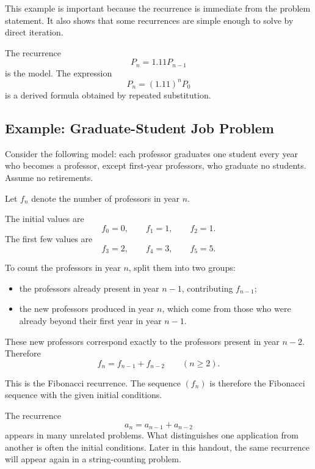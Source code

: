 This example is important because the recurrence is immediate from the problem statement. It also shows that some recurrences are simple enough to solve by direct iteration.

\begin{commonmistake}[title={Confusing the recurrence with the final closed form}]
The recurrence
\[
P_n=1.11P_{n-1}
\]
is the model. The expression
\[
P_n=(1.11)^nP_0
\]
is a derived formula obtained by repeated substitution.
\end{commonmistake}

\subsection{Example: Graduate-Student Job Problem}

Consider the following model: each professor graduates one student every year who becomes a professor, except first-year professors, who graduate no students. Assume no retirements.

Let $f_n$ denote the number of professors in year $n$.

The initial values are
\[
f_0=0,\qquad f_1=1,\qquad f_2=1.
\]
The first few values are
\[
f_3=2,\qquad f_4=3,\qquad f_5=5.
\]

\begin{examplebox}[title={Graduate-student job recurrence}]
To count the professors in year $n$, split them into two groups:
\begin{itemize}[leftmargin=*]
    \item the professors already present in year $n-1$, contributing $f_{n-1}$;
    \item the new professors produced in year $n$, which come from those who were already beyond their first year in year $n-1$.
\end{itemize}
These new professors correspond exactly to the professors present in year $n-2$. Therefore
\[
f_n=f_{n-1}+f_{n-2}
\qquad (n\ge 2).
\]
\end{examplebox}

This is the Fibonacci recurrence. The sequence $(f_n)$ is therefore the Fibonacci sequence with the given initial conditions.

\begin{extension}[title={Same recurrence, different initial conditions}]
The recurrence
\[
a_n=a_{n-1}+a_{n-2}
\]
appears in many unrelated problems. What distinguishes one application from another is often the initial conditions. Later in this handout, the same recurrence will appear again in a string-counting problem.
\end{extension}

